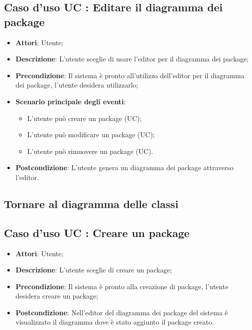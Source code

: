 \documentclass[../AnalisiDeiRequisiti.tex]{subfiles}
\begin{document}
		\subsection{Caso d'uso UC : Editare il diagramma dei package }
			\begin{itemize}
				\item \textbf{Attori}: Utente;
				\item \textbf{Descrizione}: L'utente sceglie di usare l'editor per il
				diagramma dei package;
				\item \textbf{Precondizione}: Il sistema è pronto all'utilizzo dell'editor per
				il diagramma dei package, l'utente desidera utilizzarlo;
				\item \textbf{Scenario principale degli eventi}:
					\begin{itemize}
						\item L'utente può creare un package (UC);
						\item L'utente può modificare un package (UC);
						\item L'utente può rimuovere un package (UC).
					\end{itemize}
				\item \textbf{Postcondizione}: L'utente genera un diagramma dei package
				attraverso l'editor.
			\end{itemize}
			
		\subsection{Tornare al diagramma delle classi}
		\subsection{Caso d'uso UC : Creare un package}
			\begin{itemize}
				\item \textbf{Attori}: Utente;
				\item \textbf{Descrizione}: L'utente sceglie di creare un package;
				\item \textbf{Precondizione}: Il sistema è pronto alla creazione di package,
				l'utente desidera creare un package;
				\item \textbf{Postcondizione}: Nell'editor del diagramma dei package del
				sistema è visualizzato il diagramma dove è stato aggiunto il package creato.
			\end{itemize}
\end{document}
